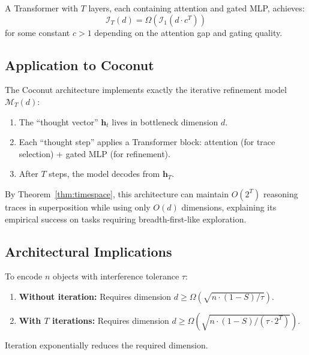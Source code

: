 \begin{corollary}
\label{cor:transformer}
A Transformer with $T$ layers, each containing attention and gated MLP, achieves:
\begin{equation}
\mathcal{I}_T(d) = \Omega(\mathcal{I}_1(d \cdot c^T))
\end{equation}
for some constant $c > 1$ depending on the attention gap and gating quality.
\end{corollary}

\subsection{Application to Coconut}

\begin{remark}
\label{rem:coconut}
The Coconut architecture \citep{hao2024training} implements exactly the iterative refinement model $\mathcal{M}_T(d)$:
\begin{enumerate}
    \item The ``thought vector'' $\mathbf{h}_t$ lives in bottleneck dimension $d$.
    \item Each ``thought step'' applies a Transformer block: attention (for trace selection) + gated MLP (for refinement).
    \item After $T$ steps, the model decodes from $\mathbf{h}_T$.
\end{enumerate}

By Theorem~\ref{thm:timespace}, this architecture can maintain $O(2^T)$ reasoning traces in superposition while using only $O(d)$ dimensions, explaining its empirical success on tasks requiring breadth-first-like exploration.
\end{remark}

\subsection{Architectural Implications}

\begin{corollary}
\label{cor:design}
To encode $n$ objects with interference tolerance $\tau$:
\begin{enumerate}
    \item \textbf{Without iteration:} Requires dimension $d \geq \Omega(\sqrt{n \cdot (1-S) / \tau})$.
    \item \textbf{With $T$ iterations:} Requires dimension $d \geq \Omega(\sqrt{n \cdot (1-S) / (\tau \cdot 2^T)})$.
\end{enumerate}
Iteration exponentially reduces the required dimension.
\end{corollary}

